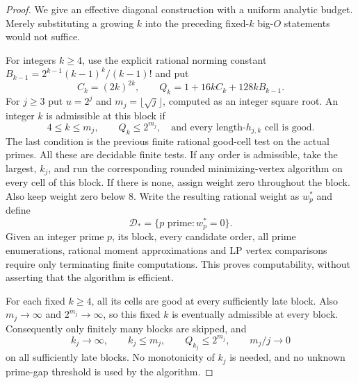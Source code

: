 \documentclass[11pt]{article}
\theoremstyle{definition}
\begin{document}
\begin{proof}
We give an effective diagonal construction with a uniform
analytic budget. Merely substituting a growing $k$ into the
preceding fixed-$k$ big-$O$ statements would not suffice.

For integers $k\ge4$, use the explicit rational norming
constant $B_{k-1}=2^{k-1}(k-1)^k/(k-1)!$ and put
\begin{equation}
 C_k=(2k)^{2k},\qquad
 Q_k=1+16kC_k+128kB_{k-1}.
 \label{eq:single-prime-rational-budget}
\end{equation}
For $j\ge3$ put $u=2^j$ and $m_j=\lfloor\sqrt j\rfloor$,
computed as an integer square root.
An integer $k$ is admissible at this block if
\begin{equation}
 4\le k\le m_j,\qquad Q_k\le2^{m_j},
 \quad\text{and every length-}h_{j,k}\text{ cell is good}.
 \label{eq:single-prime-admissible-order}
\end{equation}
The last condition is the previous finite rational good-cell
test on the actual primes. All these are decidable finite
tests. If any order is admissible, take the largest, $k_j$,
and run the corresponding rounded minimizing-vertex algorithm
on every cell of this block. If there is none, assign weight
zero throughout the block. Also keep weight zero below $8$.
Write the resulting rational weight as $w_p^*$ and define
\[
                         \mathcal D_*=\{p\text{ prime}:w_p^*=0\}.
\]
Given an integer prime $p$, its block, every candidate order,
all prime enumerations, rational moment approximations and
LP vertex comparisons require only terminating finite
computations. This proves computability, without asserting
that the algorithm is efficient.

For each fixed $k\ge4$, all its cells are good at every
sufficiently late block. Also $m_j\to\infty$ and
$2^{m_j}\to\infty$, so this fixed $k$ is eventually admissible
at every block. Consequently only finitely many blocks are
skipped, and
\begin{equation}
 k_j\longrightarrow\infty,\qquad
 k_j\le m_j,\qquad Q_{k_j}\le2^{m_j},\qquad m_j/j\longrightarrow0
 \label{eq:single-prime-order-and-budget}
\end{equation}
on all sufficiently late blocks. No monotonicity of $k_j$
is needed, and no unknown prime-gap threshold is used by
the algorithm.


\end{proof}
\end{document}
